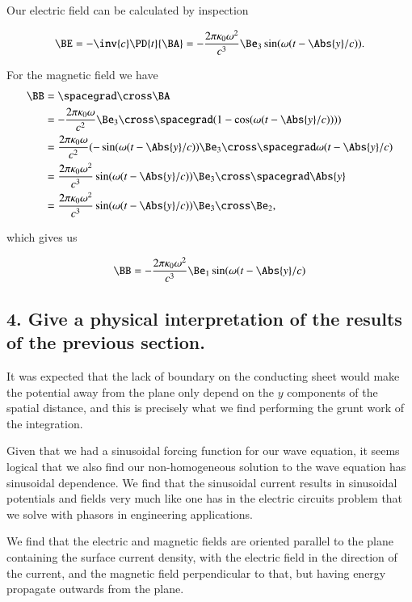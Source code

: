 Our electric field can be calculated by inspection

\begin{equation}\label{eqn:relElectroDynProblemSet5P1:190}
\BE 
= -\inv{c}\PD{t}{\BA}
= -\frac{
2 \pi \kappa_0 \omega^2
}{c^3} \Be_3 \sin(\omega(t - \Abs{y}/c)).
\end{equation}

For the magnetic field we have
\begin{align*}
\BB 
&= \spacegrad \cross \BA \\
&= -\frac{
2 \pi \kappa_0 \omega
}{c^2} \Be_3 \cross \spacegrad (1 -\cos(\omega(t - \Abs{y}/c)))) \\
&= \frac{
2 \pi \kappa_0 \omega
}{c^2} 
(-\sin(\omega(t - \Abs{y}/c))
\Be_3 \cross \spacegrad \omega(t - \Abs{y}/c) \\
&= \frac{
2 \pi \kappa_0 \omega^2
}{c^3} 
\sin(\omega(t - \Abs{y}/c))
\Be_3 \cross 
 \spacegrad \Abs{y} \\
&= \frac{
2 \pi \kappa_0 \omega^2
}{c^3} 
\sin(\omega(t - \Abs{y}/c)) 
\Be_3 \cross \Be_2,
\end{align*}

which gives us

\begin{equation}\label{eqn:relElectroDynProblemSet5P1:210}
\BB 
= 
-\frac{
2 \pi \kappa_0 \omega^2
}{c^3}
\Be_1 \sin(\omega(t - \Abs{y}/c) 
\end{equation}

\subsection{4. Give a physical interpretation of the results of the previous section.}

It was expected that the lack of boundary on the conducting sheet would make the potential away from the plane only depend on the $y$ components of the spatial distance, and this is precisely what we find performing the grunt work of the integration.  

Given that we had a sinusoidal forcing function for our wave equation, it seems logical that we also find our non-homogeneous solution to the wave equation has sinusoidal dependence.  We find that the sinusoidal current results in sinusoidal potentials and fields very much like one has in the electric circuits problem that we solve with phasors in engineering applications.

We find that the electric and magnetic fields are oriented parallel to the plane containing the surface current density, with the electric field in the direction of the current, and the magnetic field perpendicular to that, but having energy propagate outwards from the plane.

